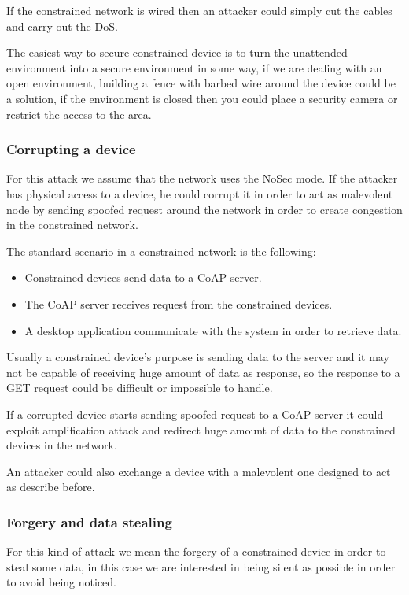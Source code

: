 	If the constrained network is wired then an attacker could simply cut the cables and carry out the DoS.\newline
	
	The easiest way to secure constrained device is to turn the unattended environment into a secure environment in some way, if we are dealing with an open environment, building a fence with barbed wire around the device could be a solution, if the environment is closed then you could place a security camera or restrict the access to the area.\newline
	
	\subsubsection{Corrupting a device}
	For this attack we assume that the network uses the NoSec mode.\newline
	If the attacker has physical access to a device, he could corrupt it in order to act as malevolent node by sending spoofed request around the network in order to create congestion in the constrained network.\newline
	
	The standard scenario in a constrained network is the following:
	\begin{itemize}
		\item Constrained devices send data to a CoAP server.
		\item The CoAP server receives request from the constrained devices.
		\item A desktop application communicate with the system in order to retrieve data.
	\end{itemize}

	Usually a constrained device's purpose is sending data to the server and it may not be capable of receiving huge amount of data as response, so the response to a GET request could be difficult or impossible to handle.\newline
	
	If a corrupted device starts sending spoofed request to a CoAP server it could exploit amplification attack and redirect huge amount of data to the constrained devices in the network.\newline
	
	An attacker could also exchange a device with a malevolent one designed to act as describe before.\newline
	
	\subsubsection{Forgery and data stealing}
	For this kind of attack we mean the forgery of a constrained device in order to steal some data, in this case we are interested in being silent as possible in order to avoid being noticed.\newline
	
